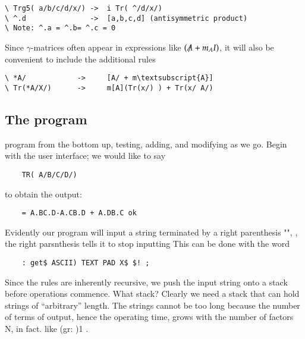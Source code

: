 \begin{verbatim}
\ Trg5( a/b/c/d/x/) ->  i Tr( ^/d/x/)
\ ^.d               ->  [a,b,c,d] (antisymmetric product)
\ Note: ^.a = ^.b= ^.c = 0
\end{verbatim}

Since $\gamma$-matrices often appear in expressions like $(\tr{A} + m_{A}I)$, it will also be convenient to include the additional rules

\begin{Verbatim}[commandchars=\\\{\}]
\ *A/            ->     [A/ + m\textsubscript{A}]
\ Tr(*A/X/)      ->     m[A](Tr(x/) ) + Tr(x/ A/)
\end{Verbatim}

\subsection{The program}
 program from the bottom up, testing, adding, and modifying as we go. Begin with the user interface; we would like to say

\begin{lstlisting}
    TR( A/B/C/D/)
\end{lstlisting}

to obtain the output:

\begin{lstlisting}
    = A.BC.D-A.CB.D + A.DB.C ok
\end{lstlisting}

Evidently our program will input a string terminated by a right parenthesis "\bc{)}", \ie, the right parsnthesis tells it to stop inputting This can be done with the word

\begin{lstlisting}
    : get$ ASCII) TEXT PAD X$ $! ;
\end{lstlisting}

Since the rules are inherently recursive, we push the input string onto a stack before operations commence. What stack? Clearly we need a stack that can hold strings of “arbitrary” length. The strings cannot be too long because the number of terms of output, hence the operating time, grows with the number of factors N, in fact. like (gr: )1 .

